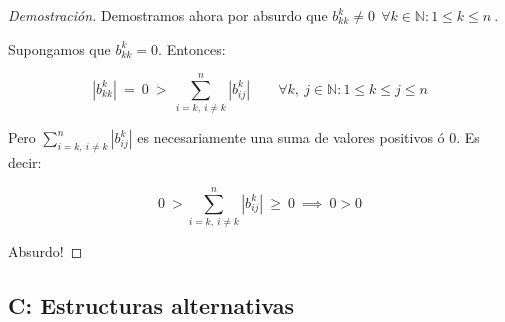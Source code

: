 \begin{proof}[Demostración]
\vspace{2em}
\noindent Demostramos ahora por absurdo que $b^{k}_{kk} \neq 0\ \ \forall k \in \mathbb{N}: 1 \leq k \leq n\ $.

\vspace{1em}
\noindent Supongamos que $b^{k}_{kk} = 0$. Entonces:

\begin{equation*}
    |b^{k}_{kk}| \ =\ 0\ >\ \sum_{i = k,\ i \neq k}^{n} |b^{k}_{ij}| \qquad \forall k,\ j \in \mathbb{N}: 1 \leq k \leq j \leq n
\end{equation*}

\vspace{1em}
\noindent Pero $\sum_{i = k,\ i \neq k}^{n} |b^{k}_{ij}|$ es necesariamente una suma de valores positivos ó $0$. Es decir: 

\begin{equation*}
    0\ > \sum_{i = k,\ i \neq k}^{n} |b^{k}_{ij}|\ \geq\ 0\ \implies\ 0 > 0
\end{equation*}

\vspace{1em}
\noindent Absurdo! 

\end{proof}
 



\newpage
\subsection{C: Estructuras alternativas}\label{A.3}